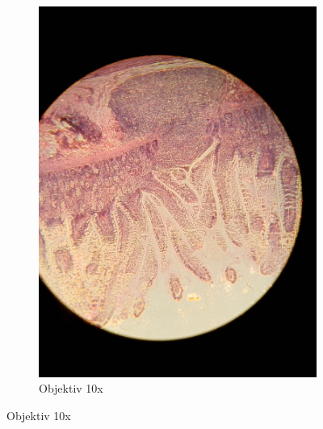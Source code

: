 \begin{figure}[h!]
\begin{subfigure}[b]{0.3\textwidth}
		\includegraphics[width=1\textwidth]{../images/03_mammal_illeum.jpg}
		\caption{Objektiv 10x}
		\label{fig:03_mammal_ileum}
	\end{subfigure}


\end{figure}
